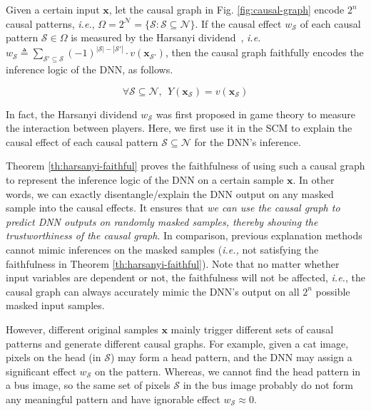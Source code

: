\documentclass[10pt,twocolumn,letterpaper]{article}
\begin{document}
\begin{theorem}\label{th:harsanyi-faithful}
Given a certain input {\small$\boldsymbol{x}$}, let the causal graph in Fig. \ref{fig:causal-graph} encode {\small$2^n$} causal patterns, \emph{i.e.}, {\small$\Omega=2^{\mathcal{N}}=\{\mathcal{S}: \mathcal{S}\subseteq\mathcal{N}\}$}.
If the causal effect {\small$w_{\mathcal{S}}$} of each causal pattern {\small$\mathcal{S}\in\Omega$} is measured by the Harsanyi dividend~\cite{harsanyi1963simplified}, \emph{i.e.} {\small$w_{\mathcal{S}} \triangleq {\sum}_{\mathcal{S}'\subseteq \mathcal{S}}(-1)^{|\mathcal{S}|-|\mathcal{S}'|}\cdot v(\boldsymbol{x}_{\mathcal{S}'})$}, then the causal graph faithfully encodes the inference logic of the DNN, as follows.
\vspace{-3pt}
\begin{small}
\begin{equation}
    \forall \mathcal{S}\subseteq \mathcal{N},\ \ 
    Y(\boldsymbol{x}_{\mathcal{S}}) = v(\boldsymbol{x}_{\mathcal{S}})
\end{equation}
\end{small}
\end{theorem}

In fact, the Harsanyi dividend {\small$w_{\mathcal{S}}$} was first proposed in game theory to measure the interaction between players. Here, we first use it in the SCM to explain the causal effect of each causal pattern {\small$\mathcal{S}\subseteq\mathcal{N}$} for the DNN's inference.


Theorem \ref{th:harsanyi-faithful} proves the faithfulness of using such a causal graph to represent the inference logic of the DNN on a certain sample {\small$\boldsymbol{x}$}.
In other words, we can exactly disentangle/explain the DNN output on any masked sample into the causal effects. It ensures that \textit{we can use the causal graph to predict DNN outputs on randomly masked samples, thereby showing the trustworthiness of the causal graph}.
In comparison, previous explanation methods \cite{Adamczewski2010bayesian,ribeiro2016should,lundberg2017unified,chen2018L2X,yoon2019invase} cannot mimic inferences on the masked samples (\emph{i.e.,} not satisfying the faithfulness in Theorem \ref{th:harsanyi-faithful}).
Note that no matter whether input variables are dependent or not, the faithfulness will not be affected, \emph{i.e.}, the causal graph can always accurately mimic the DNN's output on all {\small$2^n$} possible masked input samples.

However, different original samples {\small$\boldsymbol{x}$} mainly trigger different sets of causal patterns and generate different causal graphs. 
For example, given a cat image, pixels on the head (in {\small$\mathcal{S}$}) may form a head pattern, and the DNN may assign a significant effect {\small$w_{\mathcal{S}}$} on the pattern.
Whereas, we cannot find the head pattern in a bus image, so the same set of pixels {\small$\mathcal{S}$} in the bus image probably do not form any meaningful pattern and have ignorable effect {\small$w_{\mathcal{S}}\approx 0$}.
\end{document}
